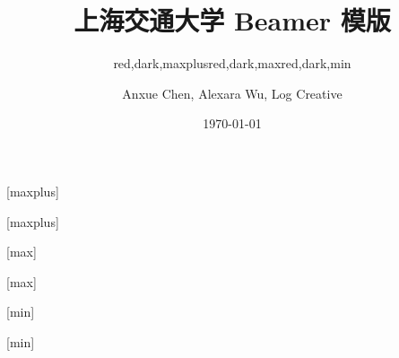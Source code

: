 \documentclass[]{ctexbeamer}
\begin{document}
\title[SJTU Beamer Template] %
{\textbf{上海交通大学 Beamer 模版}} %

\author[Anxue Chen, Alexara Wu, Log Creative]
{Anxue Chen, Alexara Wu, Log Creative}


\date{\today}

\subtitle{red,dark,maxplus}
\logo{\resizebox{!}{0.7cm}{\zhlogo}}
[maxplus]
\maketitle
{}[maxplus]
\makebottom

\subtitle{red,dark,max}
\logo{\resizebox{!}{1cm}{\sjtubadge}}
\titlegraphic{\sjtubg[opacity=0.2]}
[max]
\maketitle
{}[max]
\makebottom

\subtitle{red,dark,min}
\logo{\resizebox{!}{0.7cm}{\enlogo}}
[min]
\maketitle
{}[min]
\makebottom
\end{document}
